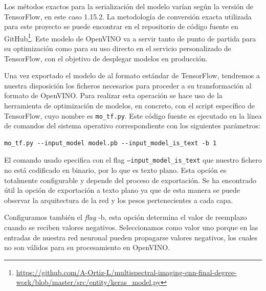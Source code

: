 Los métodos exactos para la serialización del modelo varían según la versión de TensorFlow, en este caso 1.15.2. La metodología de conversión exacta utilizada
para este proyecto se puede encontrar en el repositorio de código fuente en GitHub\footnote{\url{https://github.com/A-Ortiz-L/multispectral-imaging-cnn-final-degree-work/blob/master/src/entity/keras\_model.py}}.
Este modelo de OpenVINO va a servir tanto de punto de partida para su optimización como para su uso directo en el servicio personalizado de TensorFlow, con el objetivo de desplegar modelos en producción.

Una vez exportado el modelo de  al formato estándar de TensorFlow, tendremos a nuestra disposición los ficheros necesarios para proceder a su transformación al formato de OpenVINO.
Para realizar esta operación se hace uso de la herramienta de optimización de modelos, en concreto, con el script específico de TensorFlow, cuyo nombre
es \texttt{mo\_tf.py}. Este código fuente es ejecutado en la línea de comandos del sistema operativo correspondiente con los siguientes parámetros:


\begin{lstlisting}[caption=Comando de terminal para convertir un modelo TensorFlow a uno de OpenVINO.,
  label=a_label]
    mo_tf.py --input_model model.pb --input_model_is_text -b 1
\end{lstlisting}

El comando usado epecifica con el flag \texttt{--input\_model\_is\_text} que nuestro fichero no está codificado en binario, por lo que es texto plano.
Esta opción es totalmente configurable y depende del proceso de exportación.
Se ha encontrado útil la opción de exportación a texto plano ya que de esta manera
se puede observar la arquitectura de la red y los pesos pertenecientes a cada capa.

Configuramos también el \textit{flag} -b, esta opción determina el valor de reemplazo cuando se reciben valores negativos. Seleccionamos como valor uno porque en las entradas de nuestra red neuronal pueden propagarse valores
negativos, los cuales no son válidos para su procesamiento en OpenVINO\@.

